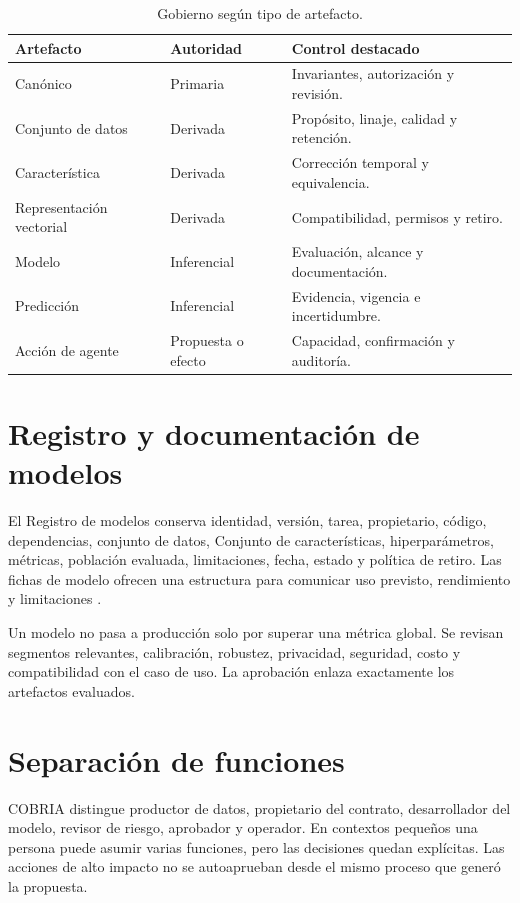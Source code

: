 \begin{table}[H]
\centering
\caption{Gobierno según tipo de artefacto.}
\label{tab:gobierno-artefactos}
\begin{tabularx}{\textwidth}{p{3cm}p{3.2cm}X}
\toprule
Artefacto & Autoridad & Control destacado \\
\midrule
Canónico & Primaria & Invariantes, autorización y revisión.\\
Conjunto de datos & Derivada & Propósito, linaje, calidad y retención.\\
Característica & Derivada & Corrección temporal y equivalencia.\\
Representación vectorial & Derivada & Compatibilidad, permisos y retiro.\\
Modelo & Inferencial & Evaluación, alcance y documentación.\\
Predicción & Inferencial & Evidencia, vigencia e incertidumbre.\\
Acción de agente & Propuesta o efecto & Capacidad, confirmación y auditoría.\\
\bottomrule
\end{tabularx}
\end{table}

\section{Registro y documentación de modelos}

El Registro de modelos conserva identidad, versión, tarea, propietario, código, dependencias,
conjunto de datos, Conjunto de características, hiperparámetros, métricas, población evaluada, limitaciones, fecha,
estado y política de retiro. Las fichas de modelo ofrecen una estructura para comunicar
uso previsto, rendimiento y limitaciones \parencite{mitchell2019modelcards}.

Un modelo no pasa a producción solo por superar una métrica global. Se revisan segmentos
relevantes, calibración, robustez, privacidad, seguridad, costo y compatibilidad con el
caso de uso. La aprobación enlaza exactamente los artefactos evaluados.

\section{Separación de funciones}

COBRIA distingue productor de datos, propietario del contrato, desarrollador del modelo,
revisor de riesgo, aprobador y operador. En contextos pequeños una persona puede asumir
varias funciones, pero las decisiones quedan explícitas. Las acciones de alto impacto no
se autoaprueban desde el mismo proceso que generó la propuesta.

